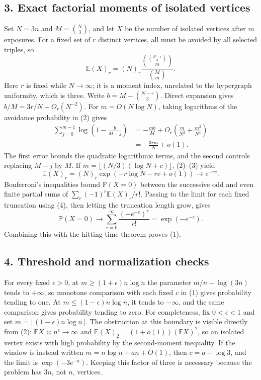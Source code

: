 \subsection*{3. Exact factorial moments of isolated vertices}
Set $N=3n$ and $M=\binom N3$, and let $X$ be the number of isolated vertices after $m$ exposures. For a fixed set of $r$ distinct vertices, all must be avoided by all selected triples, so
\[
 \mathbb E(X)_r=(N)_r
 \frac{\binom{\binom{N-r}{3}}m}{\binom Mm}. \tag{2}
\]
Here $r$ is fixed while $N\to\infty$; it is a moment index, unrelated to the hypergraph uniformity, which is three.
Write $b=M-\binom{N-r}{3}$. Direct expansion gives $b/M=3r/N+O_r(N^{-2})$. For $m=O(N\log N)$, taking logarithms of the avoidance probability in (2) gives
\[
 \begin{split}
 \sum_{j=0}^{m-1}\log\left(1-\frac b{M-j}\right)
 &=-\frac{mb}{M}+O_r\left(\frac m{N^2}+\frac{m^2}{N^4}\right)\\
 &=-\frac{3rm}{N}+o(1).
 \end{split} \tag{3}
\]
The first error bounds the quadratic logarithmic terms, and the second controls replacing $M-j$ by $M$.
If $m=\lfloor (N/3)(\log N+c)\rfloor$, (2)--(3) yield
\[
 \mathbb E(X)_r=(N)_r\exp(-r\log N-rc+o(1))
 \longrightarrow e^{-rc}. \tag{4}
\]
Bonferroni's inequalities bound $\mathbb P(X=0)$ between the successive odd and even finite partial sums of $\sum_r(-1)^r\mathbb E(X)_r/r!$. Passing to the limit for each fixed truncation using (4), then letting the truncation length grow, gives
\[
 \mathbb P(X=0)\longrightarrow\sum_{r=0}^\infty\frac{(-e^{-c})^r}{r!}
 =\exp(-e^{-c}).
\]
Combining this with the hitting-time theorem proves (1).
\subsection*{4. Threshold and normalization checks}
For every fixed $\epsilon>0$, at $m\ge(1+\epsilon)n\log n$ the parameter $m/n-\log(3n)$ tends to $+\infty$, so monotone comparison with each fixed $c$ in (1) gives probability tending to one. At $m\le(1-\epsilon)n\log n$, it tends to $-\infty$, and the same comparison gives probability tending to zero. For completeness, fix $0<\epsilon<1$ and set $m=\lfloor(1-\epsilon)n\log n\rfloor$. The obstruction at this boundary is visible directly from (2): $\mathbb EX\asymp n^\epsilon\to\infty$ and $\mathbb E(X)_2=(1+o(1))(\mathbb EX)^2$, so an isolated vertex exists with high probability by the second-moment inequality.
If the window is instead written $m=n\log n+an+O(1)$, then $c=a-\log3$, and the limit is $\exp(-3e^{-a})$. Keeping this factor of three is necessary because the problem has $3n$, not $n$, vertices.
